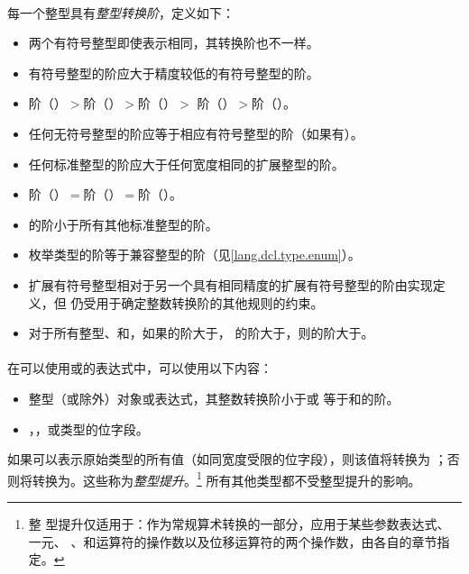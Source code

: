 \paragraph{}
每一个整型具有\textit{整型转换阶}，定义如下：
\begin{itemize}
  \item{两个有符号整型即使表示相同，其转换阶也不一样。}
  \item{有符号整型的阶应大于精度较低的有符号整型的阶。}
  \item{阶（）$>$阶（）$>$阶（）$>$
    阶（）$>$阶（）。}
  \item{任何无符号整型的阶应等于相应有符号整型的阶（如果有）。}
  \item{任何标准整型的阶应大于任何宽度相同的扩展整型的阶。}
  \item{阶（）$=$阶（）$=$阶（）。}
  \item{的阶小于所有其他标准整型的阶。}
  \item{枚举类型的阶等于兼容整型的阶（见\ref{lang.dcl.type.enum}）。}
  \item{扩展有符号整型相对于另一个具有相同精度的扩展有符号整型的阶由实现定义，但
    仍受用于确定整数转换阶的其他规则的约束。}
  \item{对于所有整型、和，如果的阶大于，
    的阶大于，则的阶大于。}
\end{itemize}

\paragraph{}
在可以使用或的表达式中，可以使用以下内容：
\begin{itemize}
  \item{整型（或除外）对象或表达式，其整数转换阶小于或
    等于和的阶。}
  \item{，，或类型的位字段。}
\end{itemize}
如果可以表示原始类型的所有值（如同宽度受限的位字段），则该值将转换为
；否则将转换为。这些称为\textit{整型提升}。\footnote{整
型提升仅适用于：作为常规算术转换的一部分，应用于某些参数表达式、一元\tm{+}、
\tm{-}、和\tm{\~}运算符的操作数以及位移运算符的两个操作数，由各自的章节指定。}
所有其他类型都不受整型提升的影响。


